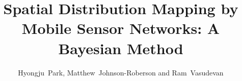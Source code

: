 \documentclass[journal]{IEEEtran}
\begin{document}
	
	

%
\title{
	 Spatial Distribution Mapping by Mobile Sensor Networks: A Bayesian Method
}
%
%
%

\author{Hyongju~Park, Matthew~Johnson-Roberson and Ram~Vasudevan
        }%

% 
%
\end{document}
